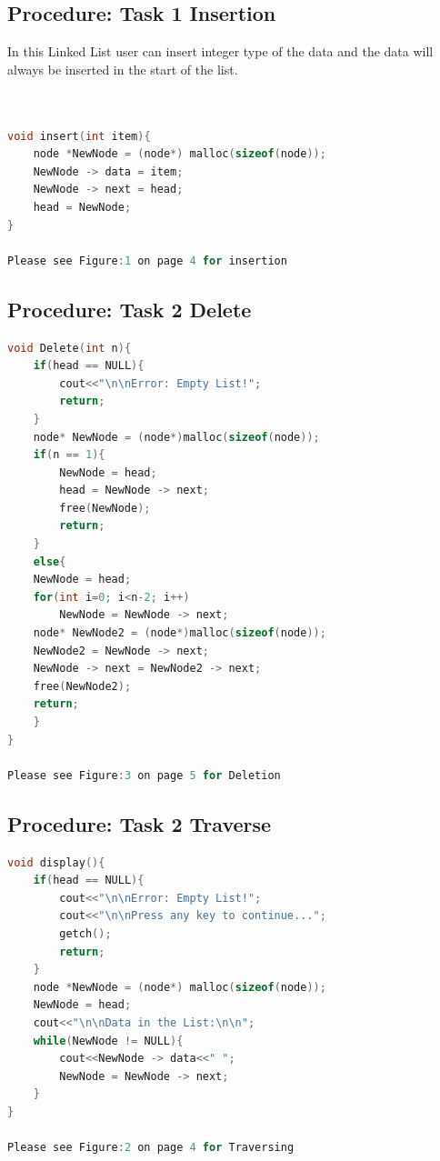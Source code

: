 \documentclass[11pt]{article}            %
\begin{document}
\subsection{Procedure: Task 1 Insertion}

In this Linked List user can insert integer type of the data and the data will always be inserted in the start of the list.  

\begin{lstlisting}[language=C++]

 
void insert(int item){
	node *NewNode = (node*) malloc(sizeof(node));
	NewNode -> data = item;
	NewNode -> next = head;
	head = NewNode;
}

Please see Figure:1 on page 4 for insertion
\end{lstlisting}  
\subsection{Procedure: Task 2 Delete}     

\begin{lstlisting}[language=C++]
void Delete(int n){
	if(head == NULL){
		cout<<"\n\nError: Empty List!";
		return;
	}
	node* NewNode = (node*)malloc(sizeof(node));
	if(n == 1){
		NewNode = head;
		head = NewNode -> next;
		free(NewNode);
		return;
	}
	else{
	NewNode = head;
	for(int i=0; i<n-2; i++)
		NewNode = NewNode -> next;
	node* NewNode2 = (node*)malloc(sizeof(node));
	NewNode2 = NewNode -> next;
	NewNode -> next = NewNode2 -> next;
	free(NewNode2);
	return;
	}
}

Please see Figure:3 on page 5 for Deletion
\end{lstlisting}
\subsection{Procedure: Task 2 Traverse}     

\begin{lstlisting}[language=C++]
void display(){
	if(head == NULL){
		cout<<"\n\nError: Empty List!";
		cout<<"\n\nPress any key to continue...";
		getch();
		return;
	}
	node *NewNode = (node*) malloc(sizeof(node));
	NewNode = head;
	cout<<"\n\nData in the List:\n\n";
	while(NewNode != NULL){
		cout<<NewNode -> data<<" ";
		NewNode = NewNode -> next;
	}
}

Please see Figure:2 on page 4 for Traversing
\end{lstlisting}
\end{document}
